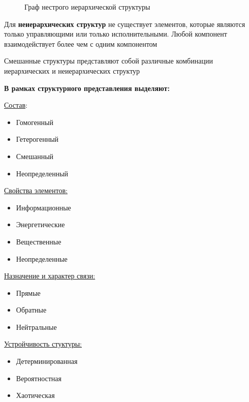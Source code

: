 \documentclass[a4paper]{article}
\begin{document}
	\begin{figure}[h]
		\centering
		\medskip
		\caption{Граф нестрого иерархической структуры} 
	\end{figure}

	Для \textbf{неиерархических структур} не существует элементов, которые являются только управляющими или только исполнительными. Любой компонент взаимодействует более чем с одним компонентом
	
	Смешанные структуры представляют собой различные комбинации иерархических и неиерархических структур
	
	\textbf{В рамках структурного представления выделяют:}
	
	\underline{Состав}: 
	\begin{itemize}
		\item Гомогенный
		\item Гетерогенный
		\item Смешанный
		\item Неопределенный
	\end{itemize}

	\underline{Свойства элементов:}
		\begin{itemize}
		\item Информационные
		\item Энергетические
		\item Вещественные
		\item Неопределенные
	\end{itemize}

	\underline{Назначение  и характер связи:}
	\begin{itemize}
		\item Прямые
		\item Обратные
		\item Нейтральные
	\end{itemize}

	\underline{Устройчивость стуктуры:}
	\begin{itemize}
		\item Детерминированная
		\item Вероятностная
		\item Хаотическая
	\end{itemize}
\end{document}
